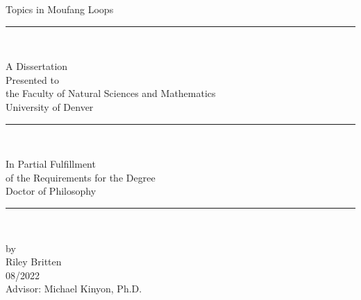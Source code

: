 \documentclass[12pt]{report}
\theoremstyle{definition}
\begin{document}
\begin{titlepage}
	\vspace*{\fill}
	\centering
	{\normalsize
            	{Topics in Moufang Loops} \\

		\vspace{1cm}
            	\rule{0.2\linewidth}{0.5pt} \\
		\vspace{5mm}

            	{A Dissertation} \\ \vspace{3mm}
            	{Presented to} \\ \vspace{3mm}
            	{the Faculty of Natural Sciences and Mathematics}\\ \vspace{3mm}
            	{University of Denver} \\

		\vspace{1cm}
            	\rule{0.2\linewidth}{0.5pt} \\
		\vspace{5mm}

            	{In Partial Fulfillment} \\ \vspace{3mm}
            	{of the Requirements for the Degree} \\ \vspace{3mm}
            	{Doctor of Philosophy} \\

		\vspace{1cm}
            	\rule{0.2\linewidth}{0.5pt} \\
		\vspace{5mm}

            	{by} \\ \vspace{3mm}
            	{Riley Britten} \\ \vspace{3mm}
            	{08/2022} \\ \vspace{3mm}
            	{Advisor: Michael Kinyon, Ph.D.}
	}
	\vspace*{\fill}
\end{titlepage}
\end{document}
